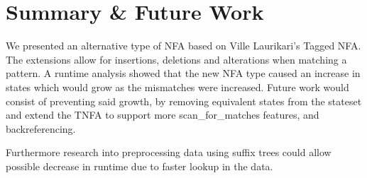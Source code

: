 \section{Summary \& Future Work}
We presented an alternative type of NFA based on Ville Laurikari's Tagged NFA.
The extensions allow for insertions, deletions and alterations when matching a pattern.
A runtime analysis showed that the new NFA type caused an increase in states which would grow as the mismatches were increased.
Future work would consist of preventing said growth, by removing equivalent states from the stateset and extend the TNFA to support more scan\_for\_matches features, and backreferencing. 

Furthermore research into preprocessing data using suffix trees\cite{Algorithmonstring} could allow possible decrease in runtime due to faster lookup in the data.